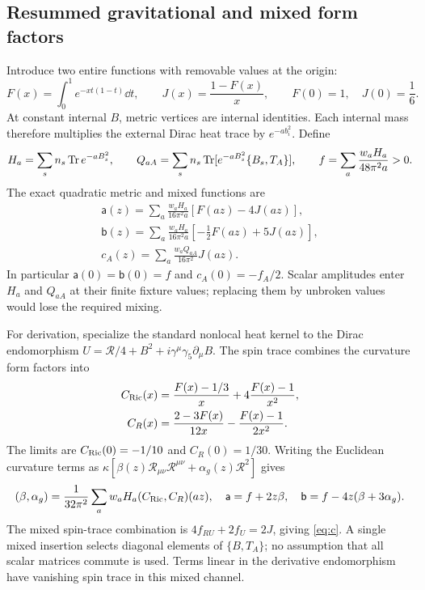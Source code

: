 \subsection{Resummed gravitational and mixed form factors}

Introduce two entire functions with removable values at the origin:
\begin{equation}
 F(x)=\int_0^1 e^{-xt(1-t)}\dd t,\qquad
 J(x)=\frac{1-F(x)}{x},\qquad F(0)=1,\quad J(0)=\frac16.\label{eq:FJ}
\end{equation}
At constant internal $B$, metric vertices are internal identities. Each internal mass therefore multiplies the external Dirac heat trace by $e^{-ab_i^2}$. Define
\begin{equation}
 H_a=\sum_s n_s\operatorname{Tr} e^{-aB_s^2},\qquad
 Q_{aA}=\sum_s n_s\operatorname{Tr}[e^{-aB_s^2}\{B_s,T_A\}],\qquad
 f=\sum_a\frac{w_aH_a}{48\pi^2a}>0.
\end{equation}
The exact quadratic metric and mixed functions are
\begin{align}
 \boxed{\mathsf a(z)=\sum_a\frac{w_aH_a}{16\pi^2a}
       [F(az)-4J(az)]},\label{eq:aa}\\
 \boxed{\mathsf b(z)=\sum_a\frac{w_aH_a}{16\pi^2a}
       [-\tfrac12F(az)+5J(az)]},\label{eq:bb}\\
 \boxed{c_A(z)=\sum_a\frac{w_aQ_{aA}}{16\pi^2}J(az)}.\label{eq:c}
\end{align}
In particular $\mathsf a(0)=\mathsf b(0)=f$ and $c_A(0)=-f_A/2$. Scalar amplitudes enter $H_a$ and $Q_{aA}$ at their finite fixture values; replacing them by unbroken values would lose the required mixing.

For derivation, specialize the standard nonlocal heat kernel \cite{CZ} to the Dirac endomorphism $U=\mathcal R/4+B^2+i\gamma^\mu\gamma_5\partial_\mu B$. The spin trace combines the curvature form factors into
\begin{align}
 C_{\rm Ric}(x)&=\frac{F(x)-1/3}{x}+4\frac{F(x)-1}{x^2},\\
 C_R(x)&=\frac{2-3F(x)}{12x}-\frac{F(x)-1}{2x^2}.
\end{align}
The limits are $C_{\rm Ric}(0)=-1/10$ and $C_R(0)=1/30$. Writing the Euclidean curvature terms as $\kappa[\beta(z)\mathcal R_{\mu\nu}\mathcal R^{\mu\nu}+\alpha_g(z)\mathcal R^2]$ gives
\begin{equation}
 (\beta,\alpha_g)=\frac1{32\pi^2}\sum_a w_aH_a(C_{\rm Ric},C_R)(az),\quad
 \mathsf a=f+2z\beta,\quad \mathsf b=f-4z(\beta+3\alpha_g).
\end{equation}
The mixed spin-trace combination is $4f_{RU}+2f_U=2J$, giving \eqref{eq:c}. A single mixed insertion selects diagonal elements of $\{B,T_A\}$; no assumption that all scalar matrices commute is used. Terms linear in the derivative endomorphism have vanishing spin trace in this mixed channel.

